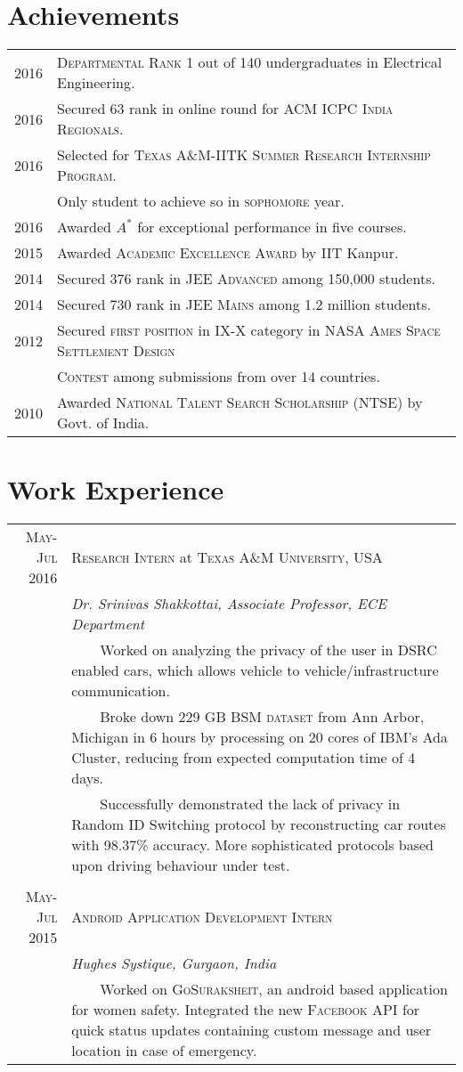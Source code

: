 \documentclass[a4paper,10pt]{article}
\newcommand{\tabitem}{~~\llap{\textbullet}~~}
\begin{document}
\section{Achievements}
\begin{tabular}{rl}
2016 & \textsc{Departmental Rank 1} out of 140 undergraduates in Electrical
Engineering.\\
2016 & Secured 63 rank in online round for \textsc{ACM ICPC India Regionals}.\\
2016 & Selected for \textsc{Texas A\&M-IITK Summer Research Internship Program}.\\ 
& Only student to achieve so in \textsc{sophomore} year.\\
2016 & Awarded $A^*$ for exceptional performance in five courses.\\
2015 & Awarded \textsc{Academic Excellence Award} by IIT Kanpur.\\
2014 & Secured 376 rank in \textsc{JEE Advanced} among 150,000 students.\\
2014 & Secured 730 rank in \textsc{JEE Mains} among 1.2 million students. \\
2012 & Secured \textsc{first position} in IX-X category in \textsc{NASA Ames Space Settlement Design}\\
&\textsc{Contest} among submissions from over 14 countries.\\
2010 & Awarded \textsc{National Talent Search Scholarship} (NTSE) by Govt. of India.

\end{tabular}
\section{Work Experience}
\centering
\begin{tabular}{r|p{11cm}}
\textsc{May-Jul 2016} & \large \textsc{Research Intern} at \textsc{Texas A\&M University, USA}\\
& \textit{Dr. Srinivas Shakkottai, Associate Professor, ECE Department}\\
& \tabitem Worked on analyzing the privacy of the user in DSRC enabled cars, which allows vehicle to vehicle/infrastructure communication.\\
& \tabitem Broke down 229 GB \textsc{BSM dataset} from Ann Arbor, Michigan in 6 hours by processing on 20 cores of IBM's Ada Cluster, reducing from expected computation time of 4 days.\\
& \tabitem Successfully demonstrated the lack of privacy in Random ID Switching protocol by reconstructing car routes with 98.37\% accuracy.
More sophisticated protocols based upon driving behaviour under test.\\
\multicolumn{2}{c}{}\\
\textsc{May-Jul 2015} & \large \textsc{Android Application Development Intern}\\
& \textit{Hughes Systique, Gurgaon, India}\\
& \tabitem Worked on \textsc{GoSuraksheit}, an android based application for women safety. Integrated the new \textsc{Facebook API} for quick status updates containing custom message and user location in case of emergency.
\end{tabular}
\end{document}
